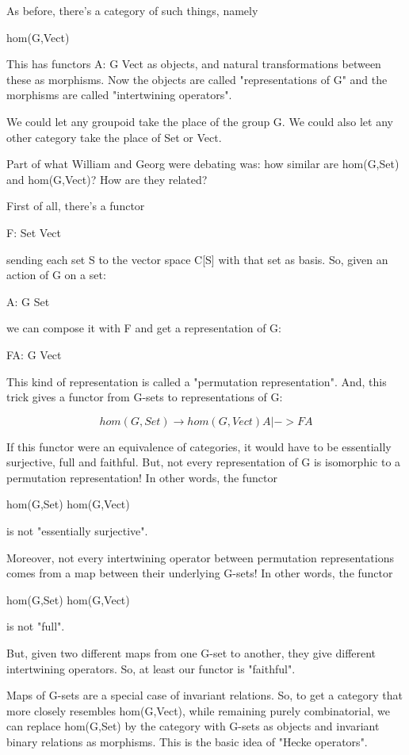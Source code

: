 As before, there's a category of such things, namely

hom(G,Vect)

This has functors A: G \to  Vect as objects, and natural transformations
between these as morphisms.  Now the objects are called "representations 
of G" and the morphisms are called "intertwining operators".

We could let any groupoid take the place of the group G.  We could also
let any other category take the place of Set or Vect.  

Part of what William and Georg were debating was: how similar are 
hom(G,Set) and hom(G,Vect)?  How are they related? 

First of all, there's a functor 

F: Set \to  Vect

sending each set S to the vector space C[S] with that set as basis.  So,
given an action of G on a set:

A: G \to  Set

we can compose it with F and get a representation of G:

FA: G \to  Vect

This kind of representation is called a "permutation representation".
And, this trick gives a functor from G-sets to representations of G:

$$
hom(G,Set) \to  hom(G,Vect) 
        A |-> FA
$$
    
If this functor were an equivalence of categories, it would have to
be essentially surjective, full and faithful.
But, not every representation of G is isomorphic to a permutation
representation!  In other words, the functor 

hom(G,Set) \to  hom(G,Vect) 

is not "essentially surjective".  

Moreover, not every intertwining operator between permutation 
representations comes from a map between their underlying G-sets!
In other words, the functor

hom(G,Set) \to  hom(G,Vect) 

is not "full".  

But, given two different maps from one G-set to another, they give 
different intertwining operators.  So, at least our functor is "faithful".  

Maps of G-sets are a special case of invariant relations.  So, to get a 
category that more closely resembles hom(G,Vect), while remaining purely 
combinatorial, we can replace hom(G,Set) by the category with G-sets as 
objects and invariant binary relations as morphisms.  This is the basic 
idea of "Hecke operators".  

